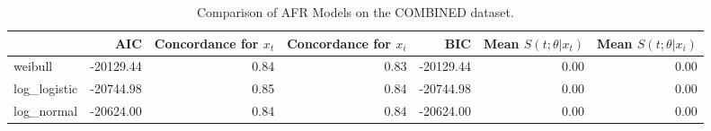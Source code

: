 \begin{table}
\caption{Comparison of AFR Models on the COMBINED dataset.}
\label{tab:Combined}
\begin{tabular}{lrrrrrr}
\toprule
 & AIC & Concordance for $x_t$ & Concordance for $x_i$ & BIC & Mean $S(t;\theta|x_{t})$ & Mean $S(t;\theta|x_{i})$ \\
\midrule
weibull & -20129.44 & 0.84 & 0.83 & -20129.44 & 0.00 & 0.00 \\
log_logistic & -20744.98 & 0.85 & 0.84 & -20744.98 & 0.00 & 0.00 \\
log_normal & -20624.00 & 0.84 & 0.84 & -20624.00 & 0.00 & 0.00 \\
\bottomrule
\end{tabular}
\end{table}
